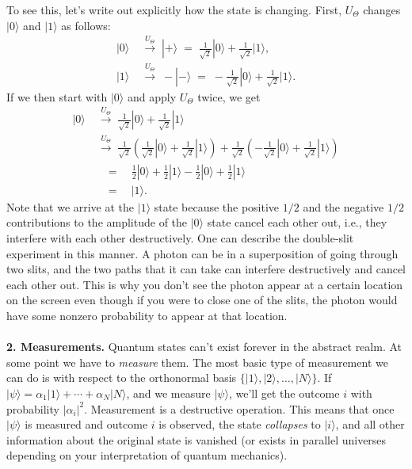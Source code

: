 \documentclass[11pt]{report}
\theoremstyle{plain}
\theoremstyle{definition}
\renewcommand{\ket}[1]{|#1\rangle}
\begin{document}
To see this, let's write out explicitly how the state is changing. First, $U_\Theta$ changes $\ket{0}$ and $\ket{1}$ as follows:
\begin{align*}
\ket{0} \; &  \overset{U_\Theta}{\longrightarrow} \; \ket{+}  \; = \; \frac{1}{\sqrt{2}} \ket{0} + \frac{1}{\sqrt{2}} \ket{1}, \\
\ket{1} \; &  \overset{U_\Theta}{\longrightarrow} \; -\ket{-}  \; = \; -\frac{1}{\sqrt{2}} \ket{0} + \frac{1}{\sqrt{2}} \ket{1}.
\end{align*}
If we then start with $\ket{0}$ and apply $U_\Theta$ twice, we get
\begin{align*}
\ket{0}  & \; \overset{U_\Theta}{\longrightarrow} \; \frac{1}{\sqrt{2}} \ket{0} + \frac{1}{\sqrt{2}} \ket{1} \\
            & \; \overset{U_\Theta}{\longrightarrow} \; \frac{1}{\sqrt{2}} \left( \frac{1}{\sqrt{2}} \ket{0} + \frac{1}{\sqrt{2}} \ket{1} \right ) + \frac{1}{\sqrt{2}} \left(  -\frac{1}{\sqrt{2}} \ket{0} + \frac{1}{\sqrt{2}} \ket{1} \right ) \\
            & \quad = \quad \frac{1}{2}\ket{0} + \frac{1}{2} \ket{1} - \frac{1}{2}\ket{0} + \frac{1}{2}\ket{1} \\
            & \quad = \quad \ket{1}.
\end{align*}
Note that we arrive at the $\ket{1}$ state because the positive $1/2$ and the negative $1/2$ contributions to the amplitude of the $\ket{0}$ state cancel each other out, i.e., they interfere with each other destructively. One can describe the double-slit experiment in this manner. A photon can be in a superposition of going through two slits, and the two paths that it can take can interfere destructively and cancel each other out. This is why you don't see the photon appear at a certain location on the screen even though if you were to close one of the slits, the photon would have some nonzero probability to appear at that location.
\\\\
\noindent
{\bf 2. Measurements.} Quantum states can't exist forever in the abstract realm. At some point we have to \emph{measure} them. The most basic type of measurement we can do is with respect to the orthonormal basis $\{\ket{1}, \ket{2}, \ldots, \ket{N}\}$. If $\ket{\psi} = \alpha_1 \ket{1} + \cdots + \alpha_N \ket{N}$, and we measure $\ket{\psi}$, we'll get the outcome $i$ with probability $|\alpha_i|^2$. Measurement is a destructive operation. This means that once $\ket{\psi}$ is measured and outcome $i$ is observed, the state \emph{collapses} to $\ket{i}$, and all other information about the original state is vanished (or exists in parallel universes depending on your interpretation of quantum mechanics).
\end{document}
